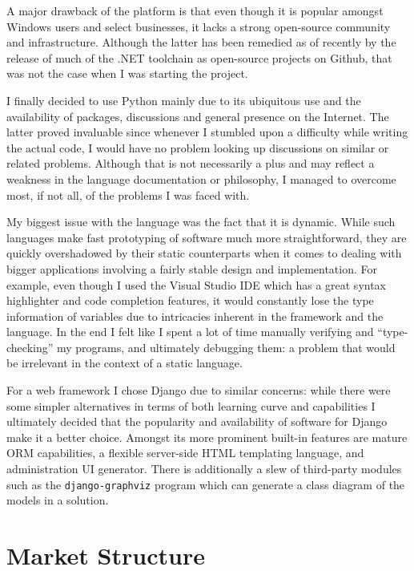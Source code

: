 \documentclass[bsc,frontabs,twoside,singlespacing,parskip,deptreport]{infthesis}     %
\begin{document}
\begin{itemize}
    A major drawback of the platform is that even though it is popular amongst Windows users and select businesses, it lacks a strong open-source community and infrastructure. Although the latter has been remedied as of recently by the release of much of the .NET toolchain as open-source projects on Github, that was not the case when I was starting the project.

\end{itemize}

    I finally decided to use Python mainly due to its ubiquitous use and the availability of packages, discussions and general presence on the Internet. The latter proved invaluable since whenever I stumbled upon a difficulty while writing the actual code, I would have no problem looking up discussions on similar or related problems. Although that is not necessarily a plus and may reflect a weakness in the language documentation or philosophy, I managed to overcome most, if not all, of the problems I was faced with.

    My biggest issue with the language was the fact that it is dynamic. While such languages make fast prototyping of software much more straightforward, they are quickly overshadowed by their static counterparts when it comes to dealing with bigger applications involving a fairly stable design and implementation. For example, even though I used the Visual Studio IDE which has a great syntax highlighter and code completion features, it would constantly lose the type information of variables due to intricacies inherent in the framework and the language. In the end I felt like I spent a lot of time manually verifying and ``type-checking'' my programs, and ultimately debugging them: a problem that would be irrelevant in the context of a static language.
    
    For a web framework I chose Django due to similar concerns: while there were some simpler alternatives in terms of both learning curve and capabilities I ultimately decided that the popularity and availability of software for Django make it a better choice. Amongst its more prominent built-in features are mature ORM capabilities, a flexible server-side HTML templating language, and administration UI generator. There is additionally a slew of third-party modules such as the {\tt django-graphviz} program which can generate a class diagram of the models in a solution.


\section{Market Structure}
\end{document}
